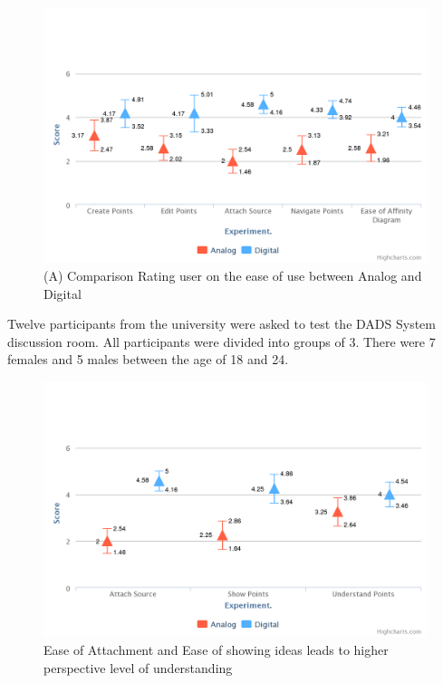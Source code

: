 \documentclass{sigchi}
\begin{document}
\begin{itemize}
\begin{itemize}
\begin{figure}[!h]
\centering
\includegraphics[width=1.1\columnwidth]{basicchart}
\caption{(A) Comparison Rating user on the ease of use between Analog and Digital}
\label{fig:figure1}
\end{figure}



 Twelve  participants from the university  were asked to test the DADS System discussion room. All participants were divided into groups of 3. There were 7 females and 5 males between the age of 18 and 24. 

\begin{figure}[!h]
\centering
\includegraphics[width=1.1\columnwidth]{attach}
\caption{Ease of Attachment and Ease of showing ideas leads to higher perspective level of understanding}
\label{fig:figure1}
\end{figure}




\end{itemize}
\end{itemize}
\end{document}
